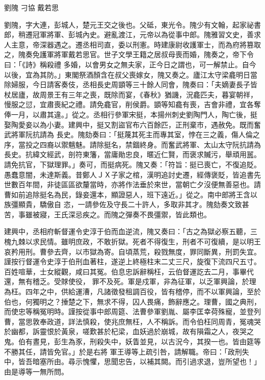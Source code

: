 
\begin{pinyinscope}
劉隗
 刁協
 戴若思



 劉隗，字大連，彭城人，楚元王交之後也。父砥，東光令。隗少有文翰，起家祕書郎，稍遷冠軍將軍、彭城內史。避亂渡江，元帝以為從事中郎。隗雅習文史，善求人主意，帝深器遇之。遷丞相司直，委以刑憲。時建康尉收護軍士，而為府將篡取之，隗奏免護軍將軍戴若思官。世子文學王籍之居叔母喪而婚，隗奏之，帝下令曰：「《詩》稱殺禮
 多婚，以會男女之無夫家，正今日之謂也，可一解禁止。自今以後，宜為其防。」東閣祭酒顏含在叔父喪嫁女，隗又奏之。廬江太守梁龕明日當除婦服，今日請客奏伎，丞相長史周顗等三十餘人同會，隗奏曰：「夫嫡妻長子皆杖居廬，故周景王有三年之喪，既除而宴，《春秋》猶譏，況龕匹夫，暮宴朝祥，慢服之愆，宜肅喪紀之禮。請免龕官，削侯爵。顗等知龕有喪，吉會非禮，宜各奪俸一月，以肅其違。」從之。丞相行參軍宋挺，本揚州刺史劉陶門人，陶亡後，挺娶陶愛妾以為小妻。建興中，挺又割盜官布六百餘匹，正刑棄市，遇赦免。既而奮武將軍阮抗請為
 長史。隗劾奏曰：「挺蔑其死主而專其室，悖在三之義，傷人倫之序，當投之四裔以禦魑魅。請除挺名，禁錮終身。而奮武將軍、太山太守阮抗請為長史。抗緯文經武，剖符東籓，當庸勛忠良，暱近仁賢，而褒求贓污，舉頑用嚚。請免抗官，下獄理罪。」奏可，而挺病死。隗又奏：「符旨：挺已喪亡，不復追貶。愚蠢意闇，未達斯義。昔鄭人ＪＸ子家之棺，漢明追討史遷，經傳褒貶，皆追書先世數百年間，非徒區區欲釐當時，亦將作法垂於來世，當朝亡夕沒便無善惡也。請曹如前追除挺名為民，錄妾還本，顯證惡人，班下遠近。」從之。南中郎將王含以族彊顯貴，驕傲自
 恣，一請參佐及守長二十許人，多取非其才。隗劾奏文致甚苦，事雖被寢，王氏深忌疾之。而隗之彈奏不畏彊禦，皆此類也。



 建興中，丞相府斬督運令史淳于伯而血逆流，隗又奏曰：「古之為獄必察五聽，三槐九棘以求民情。雖明庶政，不敢折獄。死者不得復生，刑者不可復續，是以明王哀矜用刑。曹參去齊，以市獄為寄。自頃蒸荒，殺戮無度，罪同斷異，刑罰失宜。謹按行督運令史淳于伯刑血著柱，遂逆上終極柱末二丈三尺，旋復下流四尺五寸。百姓喧華，士女縱觀，咸曰其冤。伯息忠訴辭稱枉，云伯督運訖去二月，事畢代還，無有稽乏。受賕使役，
 罪不及死。軍是戍軍，非為征軍，以乏軍興論，於理為枉。四年之中，供給運漕，凡諸徵發租調百役，皆有稽停，而不以軍興論，至於伯也，何獨明之？捶楚之下，無求不得，囚人畏痛，飾辭應之。理曹，國之典刑，而使忠等稱冤明時。謹按從事中郎周筵、法曹參軍劉胤、屬李匡幸荷殊寵，並登列曹，當思敦奉政道，詳法慎殺，使兆庶無枉，人不稱訴。而令伯枉同周青，冤魂哭於幽都，訴靈恨於黃泉，嗟歎甚於杞梁，血妖過於崩城，故有隕霜之人，夜哭之鬼。伯有晝見，彭生為豕，刑殺失中，妖眚並見，以古況今，其揆一也。皆由筵等不勝其任，請皆免官。」於是右將
 軍王導等上疏引咎，請解職。帝曰：「政刑失中，皆吾暗塞所由。尋示愧懼，思聞忠告，以補其闕。而引過求退，豈所望也！」由是導等一無所問。




\end{pinyinscope}
